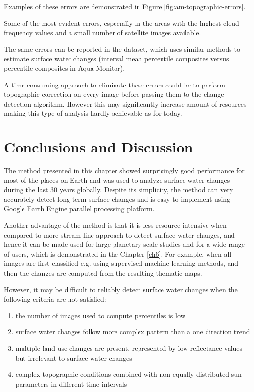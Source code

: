 Examples of these errors are demonstrated in Figure \ref{fig:am-topographic-errors}. 

Some of the most evident errors, especially in the areas with the highest cloud frequency values and a small number of satellite images available.

The same errors can be reported in the \citep{Hansen2013} dataset, which uses similar methods to estimate surface water changes (interval mean percentile composites versus percentile composites in Aqua Monitor).

A time consuming approach to eliminate these errors could be to perform topographic correction on every image before passing them to the change detection algorithm. However this may significantly increase amount of resources making this type of analysis hardly achievable as for today.


\section{Conclusions and Discussion}

The method presented in this chapter showed surprisingly good performance for most of the places on Earth and was used to analyze surface water changes during the last 30 years globally. Despite its simplicity, the method can very accurately detect long-term surface changes and is easy to implement using Google Earth Engine parallel processing platform.

Another advantage of the method is that it is less resource intensive when compared to more stream-line approach to detect surface water changes, and hence it can be made used for large planetary-scale studies and for a wide range of users, which is demonstrated in the Chapter \ref{ch6}. For example, when all images are first classified e.g. using supervised machine learning methods, and then the changes are computed from the resulting thematic maps.

However, it may be difficult to reliably detect surface water changes when the following criteria are not satisfied:

\begin{enumerate}[label=(\alph*)]
	\item \label{enum:changes-low-count} the number of images used to compute percentiles is low
	\item \label{enum:changes-complex-trend} surface water changes follow more complex pattern than a one direction trend
	\item \label{enum:changes-multple-classes} multiple land-use changes are present, represented by low reflectance values but irrelevant to surface water changes
	\item \label{enum:changes-topo} complex topographic conditions combined with non-equally distributed sun parameters in different time intervals
\end{enumerate}

